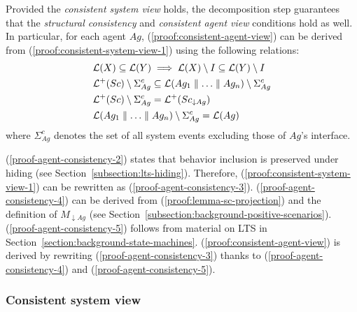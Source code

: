 Provided the \emph{consistent system view} holds, the decomposition step guarantees that the \emph{structural consistency} and \emph{consistent agent view} conditions hold as well. In particular, for each agent $Ag$, (\ref{proof:consistent-agent-view}) can be derived from (\ref{proof:consistent-system-view-1}) using the following relations:
\begin{align}
&\mathcal{L}(X) \subseteq \mathcal{L}(Y) \implies \mathcal{L}(X) \setminus I \subseteq \mathcal{L}(Y) \setminus I\label{proof-agent-consistency-2}\\
&\mathcal{L}^+(Sc) \setminus \Sigma_{Ag}^c \subseteq \mathcal{L}(Ag_1 \parallel \ldots \parallel Ag_n) \setminus \Sigma_{Ag}^c\label{proof-agent-consistency-3}\\
&\mathcal{L}^+(Sc) \setminus \Sigma_{Ag}^c = \mathcal{L}^+(Sc_{\downarrow Ag})\label{proof-agent-consistency-4}\\
&\mathcal{L}(Ag_1 \parallel \ldots \parallel Ag_n) \setminus \Sigma_{Ag}^c = \mathcal{L}(Ag)\label{proof-agent-consistency-5}
\end{align}
where $\Sigma_{Ag}^c$ denotes the set of all system events excluding those of $Ag$'s interface.

(\ref{proof-agent-consistency-2}) states that behavior inclusion is preserved under hiding (see Section~\ref{subsection:lts-hiding}). 
Therefore, (\ref{proof:consistent-system-view-1}) can be rewritten as (\ref{proof-agent-consistency-3}). 
(\ref{proof-agent-consistency-4}) can be derived from (\ref{proof:lemma-sc-projection}) and the definition of $M_{\downarrow Ag}$ (see Section~\ref{subsection:background-positive-scenarios}). 
(\ref{proof-agent-consistency-5}) follows from material on LTS in Section~\ref{section:background-state-machines}. 
(\ref{proof:consistent-agent-view}) is derived by rewriting (\ref{proof-agent-consistency-3}) thanks to (\ref{proof-agent-consistency-4}) and (\ref{proof-agent-consistency-5}).

\subsubsection*{Consistent system view}

